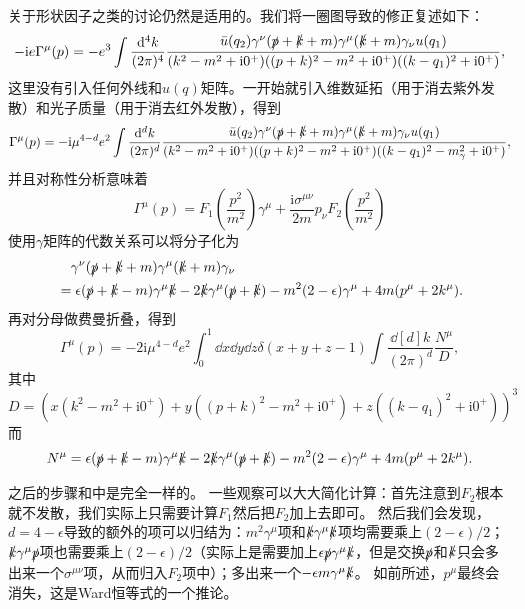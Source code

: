 \documentclass[hyperref, UTF8, a4paper]{ctexart}
\newcommand*{\ii}{\mathrm{i}}
\renewcommand{\autoref}{\prettyref}
\begin{document}
关于形状因子之类的讨论仍然是适用的。我们将一圈图导致的修正复述如下：
\[
    - \ii e \Gamma^\mu(p) = - e^3 \int \frac{\dd[4]{k}}{(2\pi)^4} \frac{\bar{u}(q_2) \gamma^\nu (\slashed{p} + \slashed{k} + m) \gamma^\mu (\slashed{k} + m) \gamma_\nu u(q_1)}{(k^2 - m^2 + \ii 0^+) ((p + k)^2 - m^2 + \ii 0^+) ((k - q_1)^2 + \ii 0^+)} ,
\]
这里没有引入任何外线和$u(q)$矩阵。一开始就引入维数延拓（用于消去紫外发散）和光子质量（用于消去红外发散），得到
\begin{equation}
    \Gamma^\mu(p) = - \ii \mu^{4-d} e^2 \int \frac{\dd[d]{k}}{(2\pi)^d} \frac{\bar{u}(q_2) \gamma^\nu (\slashed{p} + \slashed{k} + m) \gamma^\mu (\slashed{k} + m) \gamma_\nu u(q_1)}{(k^2 - m^2 + \ii 0^+) ((p + k)^2 - m^2 + \ii 0^+) ((k - q_1)^2 - m_\gamma^2 + \ii 0^+)} ,
\end{equation}
并且对称性分析意味着
\begin{equation}
    \Gamma^\mu(p) = F_1\left(\frac{p^2}{m^2}\right) \gamma^\mu + \frac{\ii \sigma^{\mu \nu}}{2m} p_\nu F_2\left(\frac{p^2}{m^2}\right)
\end{equation}
使用$\gamma$矩阵的代数关系可以将分子化为
\[
    \begin{aligned}
        &\quad \gamma^\nu (\slashed{p} + \slashed{k} + m) \gamma^\mu (\slashed{k} + m) \gamma_\nu \\
        &= \epsilon (\slashed{p} + \slashed{k} - m) \gamma^\mu \slashed{k} - 2 \slashed{k} \gamma^\mu (\slashed{p} + \slashed{k}) - m^2 (2 - \epsilon) \gamma^\mu + 4m (p^\mu + 2 k^\mu).
    \end{aligned}
\]
再对分母做费曼折叠，得到
\begin{equation}
    \Gamma^\mu(p) = - 2 \ii \mu^{4-d} e^2 \int_0^1 \dd{x} \dd{y} \dd{z} \delta(x + y + z - 1) \int \frac{\dd[d]{k}}{(2\pi)^d} \frac{N^\mu}{D},
\end{equation}
其中
\begin{equation}
    D = (x (k^2 - m^2 + \ii 0^+) + y ((p + k)^2 - m^2 + \ii 0^+) + z ((k - q_1)^2 + \ii 0^+))^3
\end{equation}
而
\begin{equation}
    N^\mu = \epsilon (\slashed{p} + \slashed{k} - m) \gamma^\mu \slashed{k} - 2 \slashed{k} \gamma^\mu (\slashed{p} + \slashed{k}) - m^2 (2 - \epsilon) \gamma^\mu + 4m (p^\mu + 2 k^\mu).
\end{equation}

之后的步骤和\autoref{sec:abnormal-magnetic}中是完全一样的。
一些观察可以大大简化计算：首先注意到$F_2$根本就不发散，我们实际上只需要计算$F_1$然后把$F_2$加上去即可。
然后我们会发现，$d=4-\epsilon$导致的额外的项可以归结为：$m^2 \gamma^\mu$项和$\slashed{k} \gamma^\mu \slashed{k}$项均需要乘上$(2-\epsilon) / 2$；$\slashed{k} \gamma^\mu \slashed{p}$项也需要乘上$(2 - \epsilon) / 2$（实际上是需要加上$\epsilon \slashed{p} \gamma^\mu \slashed{k}$，但是交换$\slashed{p}$和$\slashed{k}$只会多出来一个$\sigma^{\mu \nu}$项，从而归入$F_2$项中）；多出来一个$- \epsilon m \gamma^\mu \slashed{k}$。
如前所述，$p^\mu$最终会消失，这是Ward恒等式的一个推论。
\end{document}
